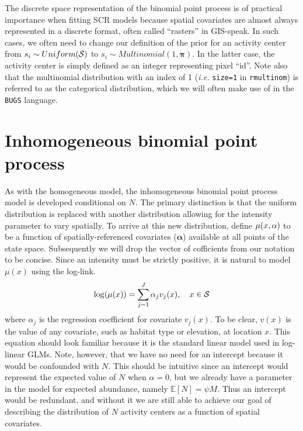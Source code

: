 The discrete space representation of the binomial point process is of
practical importance when fitting SCR models because spatial covariates
are almost always represented in a discrete format, often called
``rasters'' in GIS-speak. In such cases, we often need to change our
definition of the prior for an activity center from $s_i \sim
Uniform(\cal{S})$ to $s_i \sim Multinomial(1, \mathbf{\pi})$. In the
latter case, the activity center is simply defined as an integer
representing pixel ``id''. Note also that the multinomial distribution
with an index of 1 (\emph{i.e.} \verb+size=1+ in \verb+rmultinom+)
is referred to as the categorical distribution,
which we will often make use of in the \verb+BUGS+ language.



\section{Inhomogeneous binomial point process}

As with the homogeneous model, the inhomogeneous binomial point process
model is developed conditional on $N$. The primary distinction is that
the uniform distribution is replaced with another distribution
allowing for the intensity parameter to vary spatially. To arrive at
this new distribution, define $\mu(x, {\bf \alpha})$ to be a function of
spatially-referenced covariates ($\mathbf{\alpha}$) available at all points of the state
space.  Subsequently we will drop the vector of cofficients from our
notation to be concise. Since an intensity must be strictly
positive, it is natural to model $\mu(x)$ using the log-link.
\[
\log(\mu(x)) = \sum_{j=1}^J \alpha_j v_j(x), \quad  x \in \cal{S}
\]
where $\alpha_j$ is the regression coefficient for covariate
$v_j(x)$. To be clear, $v(x)$ is the value of any covariate, such as
habitat type or elevation, at location $x$.  This equation should look
familiar because it is the standard linear model used in log-linear
GLMs. Note, however, that we have no need
for an intercept because it would be confounded with
$N$. This should be intuitive since an intercept would
represent the expected value of $N$ when $\alpha=0$, but we already
have a parameter in the model for expected abundance, namely $\mathbb{E}[N] =
\psi M$. Thus an intercept would be
redundant, and without it we are still able to achieve our goal of
describing the distribution of $N$ activity centers as a function of
spatial covariates.


